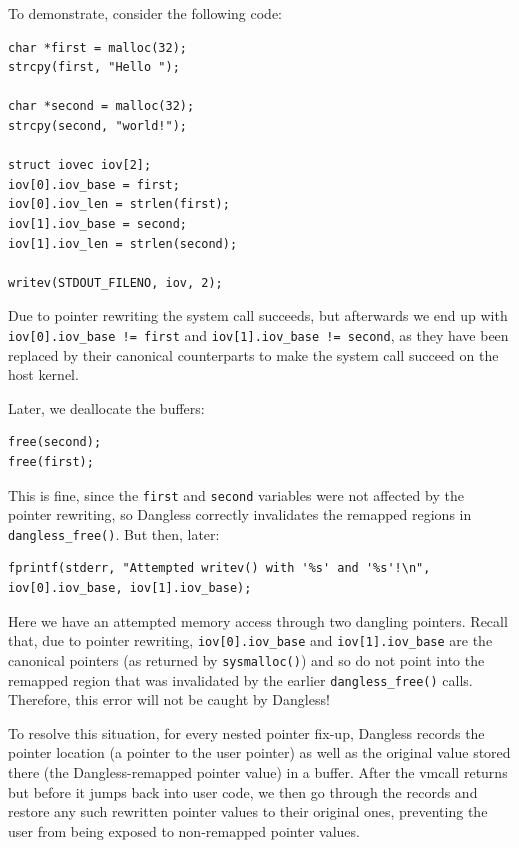 To demonstrate, consider the following code:

\begin{lstlisting}
char *first = malloc(32);
strcpy(first, "Hello ");

char *second = malloc(32);
strcpy(second, "world!");

struct iovec iov[2];
iov[0].iov_base = first;
iov[0].iov_len = strlen(first);
iov[1].iov_base = second;
iov[1].iov_len = strlen(second);

writev(STDOUT_FILENO, iov, 2);
\end{lstlisting}

Due to pointer rewriting the system call succeeds, but afterwards we end up with \lstinline|iov[0].iov_base != first| and \lstinline|iov[1].iov_base != second|, as they have been replaced by their canonical counterparts to make the system call succeed on the host kernel.

Later, we deallocate the buffers:

\begin{lstlisting}
free(second);
free(first);
\end{lstlisting}

This is fine, since the \lstinline!first! and \lstinline!second! variables were not affected by the pointer rewriting, so Dangless correctly invalidates the remapped regions in \lstinline!dangless_free()!. But then, later:

\begin{lstlisting}
fprintf(stderr, "Attempted writev() with '%s' and '%s'!\n", iov[0].iov_base, iov[1].iov_base);
\end{lstlisting}

Here we have an attempted memory access through two dangling pointers. Recall that, due to pointer rewriting, \lstinline|iov[0].iov_base| and \lstinline|iov[1].iov_base| are the canonical pointers (as returned by \lstinline!sysmalloc()!) and so do not point into the remapped region that was invalidated by the earlier \lstinline!dangless_free()! calls. Therefore, this error will not be caught by Dangless!

To resolve this situation, for every nested pointer fix-up, Dangless records the pointer location (a pointer to the user pointer) as well as the original value stored there (the Dangless-remapped pointer value) in a buffer. After the vmcall returns but before it jumps back into user code, we then go through the records and restore any such rewritten pointer values to their original ones, preventing the user from being exposed to non-remapped pointer values.

